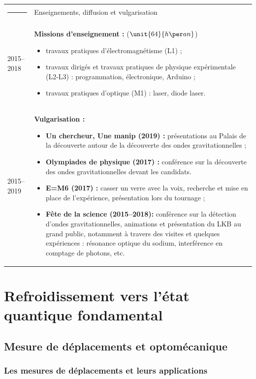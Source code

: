 \documentclass[12pt,a4paper]{article}
\begin{document}
\begin{tabular*}{\textwidth}{p{}<{\raggedleft}p{}}
\textcolor{theme}{\rule{0.12\textwidth}{2.5mm}} &
\large\textcolor{theme}{Enseignements, diffusion et vulgarisation} \vspace{3pt} \\
2015--2018 & \textbf{Missions d'enseignement :} ($\unit{64}{h\per an}$)
\begin{itemize}
\item travaux pratiques d'électromagnétisme (L1) ;
\item travaux dirigés et travaux pratiques de physique expérimentale (L2-L3) : programmation, électronique, Arduino ;
\item travaux pratiques d'optique (M1) : laser, diode laser.
\end{itemize}\\
\vspace{-8mm} 2015--2019 &
\vspace{-8mm}\textbf{Vulgarisation :}
\begin{itemize}
\item \textbf{Un chercheur, Une manip (2019) :} présentations au Palais de la découverte autour de la découverte des ondes gravitationnelles ;
\item \textbf{Olympiades de physique (2017) :} conférence sur la découverte des ondes gravitationnelles devant les candidats.
\item \textbf{E=M6 (2017) :} casser un verre avec la voix, recherche et mise en place de l'expérience, présentation lors du tournage ;
\item \textbf{Fête de la science (2015--2018):} conférence sur la détection d'ondes gravitationnelles, animations et présentation du LKB au grand public, notamment à travers des visites et quelques expériences : résonance optique du sodium, interférence en comptage de photons, etc.
\end{itemize}
\end{tabular*}

\section{Refroidissement vers l'état quantique fondamental}

\subsection{Mesure de déplacements et optomécanique}
\label{sec:intro}

\subsubsection{Les mesures de déplacements et leurs applications}
\end{document}
